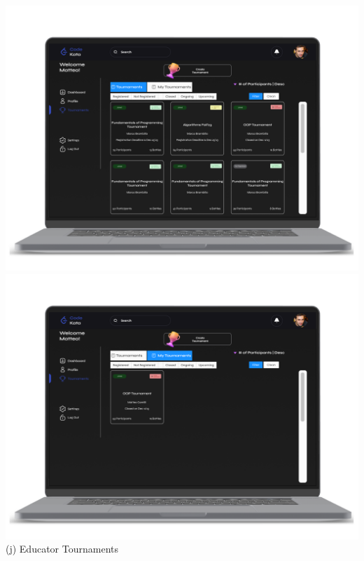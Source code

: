 \begin{center}
\includegraphics[scale=0.13]{Images/ui-ux/educator_tournaments_1.png}
\includegraphics[scale=0.13]{Images/ui-ux/educator_tournaments_2.png}
        (j) Educator Tournaments
\end{center}
